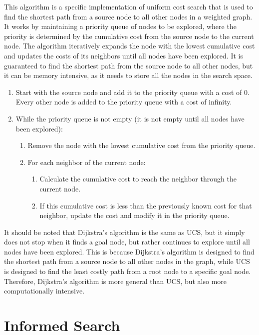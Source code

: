 This algorithm is a specific implementation of uniform cost search that is used to find the shortest path from a source node to all other nodes in a weighted graph. It works by maintaining a priority queue of nodes to be explored, where the priority is determined by the cumulative cost from the source node to the current node. The algorithm iteratively expands the node with the lowest cumulative cost and updates the costs of its neighbors until all nodes have been explored. It is guaranteed to find the shortest path from the source node to all other nodes, but it can be memory intensive, as it needs to store all the nodes in the search space.
\begin{enumerate}
    \item Start with the source node and add it to the priority queue with a cost of 0. Every other node is added to the priority queue with a cost of infinity.
    \item While the priority queue is not empty (it is not empty until all nodes have been explored):
    \begin{enumerate}
        \item Remove the node with the lowest cumulative cost from the priority queue.
        \item For each neighbor of the current node:
        \begin{enumerate}
            \item Calculate the cumulative cost to reach the neighbor through the current node.
            \item If this cumulative cost is less than the previously known cost for that neighbor, update the cost and modify it in the priority queue.
        \end{enumerate}
    \end{enumerate}
\end{enumerate}

It should be noted that Dijkstra's algorithm is the same as UCS, but it simply does not stop when it finds a goal node, but rather continues to explore until all nodes have been explored. This is because Dijkstra's algorithm is designed to find the shortest path from a source node to all other nodes in the graph, while UCS is designed to find the least costly path from a root node to a specific goal node. Therefore, Dijkstra's algorithm is more general than UCS, but also more computationally intensive.


\section{Informed Search}

